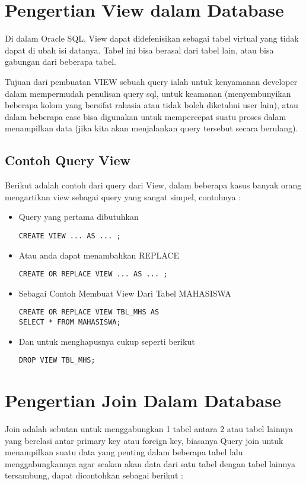 \section{Pengertian View dalam Database}
Di dalam Oracle SQL, View dapat didefenisikan sebagai tabel virtual yang tidak dapat di ubah isi datanya. Tabel ini bisa berasal dari tabel lain, atau bisa gabungan dari beberapa tabel.
\par Tujuan dari pembuatan VIEW sebuah query ialah untuk kenyamanan developer dalam mempermudah penulisan query sql, untuk keamanan (menyembunyikan beberapa kolom yang bersifat rahasia atau tidak boleh diketahui user lain), atau dalam beberapa case bisa digunakan untuk mempercepat suatu proses dalam menampilkan data (jika kita akan menjalankan query tersebut secara berulang).

\subsection{Contoh Query View}
Berikut adalah contoh dari query dari View, dalam beberapa kasus banyak orang mengartikan view sebagai query yang sangat simpel, contohnya :
\begin{itemize}
    \item Query yang pertama dibutuhkan 
\begin{lstlisting}
CREATE VIEW ... AS ... ;
\end{lstlisting}
    \item Atau anda dapat menambahkan REPLACE
\begin{lstlisting}
CREATE OR REPLACE VIEW ... AS ... ;
\end{lstlisting}
    \item Sebagai Contoh Membuat View Dari Tabel MAHASISWA
\begin{lstlisting}
CREATE OR REPLACE VIEW TBL_MHS AS
SELECT * FROM MAHASISWA;
\end{lstlisting}
    \item Dan untuk menghapusnya cukup seperti berikut
\begin{lstlisting}
DROP VIEW TBL_MHS;
\end{lstlisting}
\end{itemize}

\section{Pengertian Join Dalam Database}
Join adalah sebutan untuk menggabungkan 1 tabel antara 2 atau tabel lainnya yang berelasi antar primary key atau foreign key, biasanya Query join untuk menampilkan suatu data yang penting dalam beberapa tabel lalu menggabungkannya agar seakan akan data dari satu tabel dengan tabel lainnya tersambung, dapat dicontohkan sebagai berikut :

